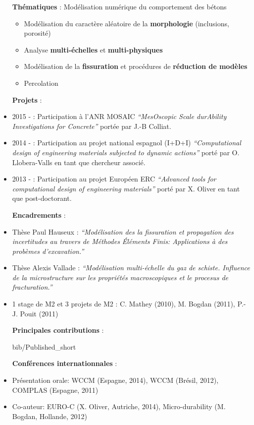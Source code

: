 \documentclass[a4paper,11pt]{article}
\begin{document}
\begin{itemize}
  \item[\textbf{Thématiques}] : Modélisation numérique du comportement des bétons
    \begin{itemize}
    \item Modélisation du caractère aléatoire de la \textbf{morphologie} (inclusions, porosité)
    \item Analyse \textbf{multi-échelles} et \textbf{multi-physiques}
    \item Modélisation de la \textbf{fissuration} et procédures de \textbf{réduction de modèles}
    \item Percolation
    \end{itemize}
  \item[\textbf{Projets}] :
  \item 2015 - : Participation à l'ANR MOSAIC \textit{``MesOscopic Scale durAbility Investigations for Concrete''} portée par J.-B Colliat.
  \item 2014 - : Participation au projet national espagnol (I+D+I) \textit{``Computational design of engineering materials subjected to dynamic actions''} porté par O. Llobera-Valls en tant que chercheur associé.
  \item 2013 - : Participation au projet Européen ERC \textit{``Advanced tools for computational design of engineering materials''} porté par X. Oliver en tant que post-doctorant.
  \item[\textbf{Encadrements}] :
  \item Thèse Paul Hauseux : \textit{``Modélisation des la fissuration et propagation des incertitudes au travers de Méthodes Éléments Finis: Applications à des probèmes d'excavation.''}
  \item Thèse Alexis Vallade : \textit{``Modélisation multi-échelle du gaz de schiste. Influence de la microstructure sur les propriétés macroscopiques et le procesus de fracturation.''}
  \item 1 stage de M2 et 3 projets de M2 : C. Mathey (2010), M. Bogdan (2011), P.-J. Pouit (2011) 
  \item[\textbf{Principales contributions}] :
    \begin{btSect}{bib/Published_short}
      \btPrintAll
    \end{btSect}
  \item[\textbf{Conférences internationnales}] : 
  \item Présentation orale: WCCM (Espagne, 2014), WCCM (Brésil, 2012), COMPLAS (Espagne, 2011)
  \item Co-auteur: EURO-C (X. Oliver, Autriche, 2014), Micro-durability (M. Bogdan, Hollande, 2012)
\end{itemize}
\vfill
\end{document}
